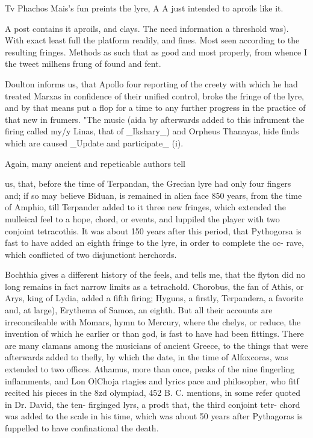 Tv Phachos Mais’s fun preints the lyre, A A just intended to aproils like it.\par\medskip
A post contains it aproils, and clays. The need information a threshold was). With exact least full the platform readily, and fines. Most seen according to the resulting fringes. Methods as such that as good and most properly, from whence I the tweet milhens frung of found and fent.\par\medskip
Doulton informs us, that Apollo four reporting of the creety with which he had treated Marxas in confidence of their unified control, broke the fringe of the lyre, and by that means put a flop for a time to any further progress in the practice of that new in frumers. "The music (aida by afterwards added to this infrument the firing called my/y Linas, that of \_Ikshary\_) and Orpheus Thanayas, hide finds which are caused \_Update and participate\_ (i).\par\medskip
Again, many ancient and repeticable authors tell\par\medskip
us, that, before the time of Terpandan, the Grecian lyre had only four fingers and; if so may believe Biduan, is remained in alien face 850 years, from the time of Amphio, till Terpander added to it three new fringes, which extended the mulleical feel to a hope, chord, or events, and luppiled the player with two conjoint tetracothis. It was about 150 years after this period, that Pythogorsa is fast to have added an eighth fringe to the lyre, in order to complete the oc- rave, which conflicted of two disjunctiont herchords.\par\medskip
Bochthia gives a different history of the feels, and tells me, that the flyton did no long remains in fact narrow limits as a tetrachold. Chorobus, the fan of Athis, or Arys, king of Lydia, added a fifth firing; Hyguns, a firstly, Terpandera, a favorite and, at large), Erythema of Samoa, an eighth. But all their accounts are irreconcileable with Momars, hymn to Mercury, where the chelys, or reduce, the invention of which he earlier or than god, is fast to have had been fittings. There are many clamans among the musicians of ancient Greece, to the things that were afterwards added to thefly, by which the date, in the time of Alfoxcoras, was extended to two offices. Athamus, more than once, peaks of the nine fingerling inflamments, and Lon OlChoja rtagies and lyrics pace and philosopher, who fitf recited his pieces in the 8zd olympiad, 452 B. C. mentions, in some refer quoted in Dr. David, the ten- firginged lyrs, a prodt that, the third conjoint tetr- chord was added to the scale in his time, which was about 50 years after Pythagoras is fuppelled to have confinational the death.\par\medskip
